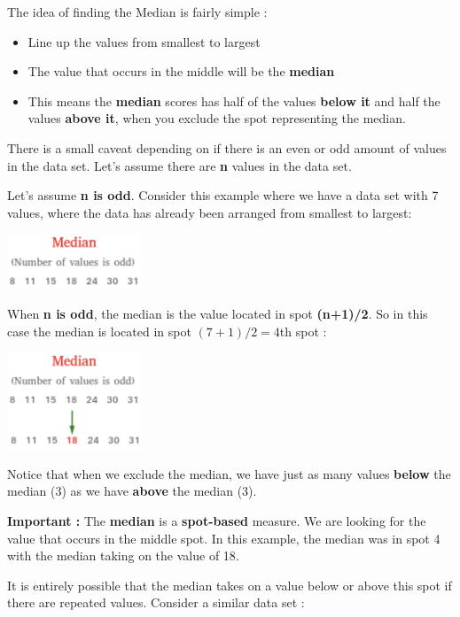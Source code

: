 \documentclass[
  letterpaper,
  DIV=11,
  numbers=noendperiod]{scrreprt}
\begin{document}
The idea of finding the Median is fairly simple :

\begin{itemize}
\item
  Line up the values from smallest to largest
\item
  The value that occurs in the middle will be the \textbf{median}
\item
  This means the \textbf{median} scores has half of the values
  \textbf{below it} and half the values \textbf{above it}, when you
  exclude the spot representing the median.
\end{itemize}

There is a small caveat depending on if there is an even or odd amount
of values in the data set. Let's assume there are \textbf{n} values in
the data set.

Let's assume \textbf{n is odd}. Consider this example where we have a
data set with 7 values, where the data has already been arranged from
smallest to largest:

\includegraphics[width=0.3\textwidth,height=\textheight]{./images/Daily-4-Pic-4.jpg}

When \textbf{n is odd}, the median is the value located in spot
\textbf{(n+1)/2}. So in this case the median is located in spot
\((7+1)/2 = 4\)th spot :

\includegraphics[width=0.3\textwidth,height=\textheight]{./images/Daily-4-Pic-5.jpg}

Notice that when we exclude the median, we have just as many values
\textbf{below} the median (3) as we have \textbf{above} the median (3).

\textbf{Important :} The \textbf{median} is a \textbf{spot-based}
measure. We are looking for the value that occurs in the middle spot. In
this example, the median was in spot 4 with the median taking on the
value of 18.

It is entirely possible that the median takes on a value below or above
this spot if there are repeated values. Consider a similar data set :
\end{document}
